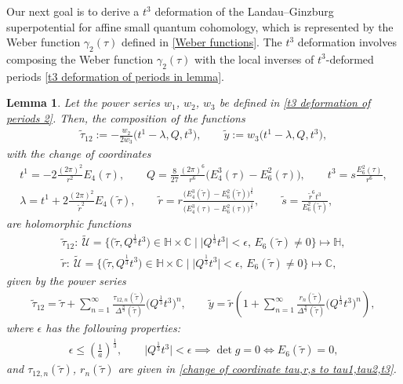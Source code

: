\documentclass[pdftex]{sigma}
\numberwithin{equation}{section}
\newtheorem{Lemma}[Theorem]{Lemma}
\begin{document}
Our next goal is to derive a $t^3$ deformation of the Landau--Ginzburg superpotential for affine small quantum cohomology, which is represented by the Weber function $\gamma_2(\tau)$ defined in \eqref{Weber functions}. The $t^3$ deformation involves composing the Weber function $\gamma_2(\tau)$ with the local inverses of $t^3$-deformed periods \eqref{t3 deformation of periods in lemma}.

\begin{Lemma}\label{lemma Milanov deformation 1 on LG superpotential}
Let the power series $w_1$, $w_2$, $w_3$ be defined in \eqref{t3 deformation of periods 2}.
Then, the composition of the functions
\begin{gather}
\tilde \tau_{12}:=-\frac{w_2}{2w_3}\bigl(t^1-\lambda,Q,t^3\bigr),\qquad
\tilde y:=w_3\bigl(t^1-\lambda,Q,t^3\bigr),\label{affine extended w2 w3 Big lemma}
\end{gather}
with the change of coordinates
\begin{gather}
t^1= -2\frac{(2\pi)^2}{r^2}E_4(\tau),\qquad Q= \frac{8}{27}\frac{(2\pi)^6}{r^6}\bigl(E_4^3(\tau)-E_6^2(\tau)\bigr),\qquad t^3= s\frac{E_6^2(\tau)}{r^6},\nonumber\\
\lambda= t^1+2\frac{(2\pi)^2}{\tilde r^2}E_4(\tilde\tau), \qquad \tilde r=r\frac{\bigl(E_4^3(\tilde\tau)-E_6^2(\tilde\tau)\bigr)^{\frac{1}{6}}}{\bigl(E_4^3(\tau)-E_6^2(\tau)\bigr)^{\frac{1}{6}}},\qquad \tilde s=\frac{\tilde r^6t^3}{E_6^2(\tilde\tau)},\label{change of extended coordinates flat intersection and auxiliary}
\end{gather}
are holomorphic functions
\begin{gather*}
\tilde\tau_{12}\colon \ \tilde{\mathcal{U}}=\bigl\{ \bigl(\tilde\tau,Q^{\frac{1}{3}}t^3\bigr)\in\mathbb{H}\times \mathbb{C}\mid \big|Q^{\frac{1}{3}}t^3\big|<\epsilon,\, E_6(\tilde\tau)\neq 0 \bigr\}\mapsto \mathbb{H},\\
\tilde r\colon \ \tilde{\mathcal{U}}=\bigl\{ \bigl(\tilde\tau,Q^{\frac{1}{3}}t^3\bigr)\in\mathbb{H}\times \mathbb{C}\mid \big|Q^{\frac{1}{3}}t^3\big|<\epsilon, \, E_6(\tilde\tau)\neq 0 \bigr\}\mapsto \mathbb{C},
\end{gather*}
given by the power series
\begin{gather}
\tilde\tau_{12}=\tilde\tau+\sum_{n=1}^{\infty}\frac{\tau_{12,n}(\tilde\tau)}{\Delta^{\frac{n}{3}}(\tilde\tau)} \bigl( Q^{\frac{1}{3}}t^3\bigr)^n,\qquad
\tilde y=\tilde r\left( 1+\sum_{n=1}^{\infty} \frac{r_n(\tilde\tau)}{\Delta^{\frac{n}{3}}(\tilde\tau)} \bigl(Q^{\frac{1}{3}} t^3 \bigr)^n \right),\label{affine in lambda t3 deformation of periods new coordinates z2 over z3 lemma}
\end{gather}
where $\epsilon$ has the following properties:
\begin{gather*}
\epsilon\leq \left(\frac{1}{a}\right)^{\frac{1}{3}} ,\qquad
\big|Q^{\frac{1}{3}}t^3\big|<\epsilon \implies \det g=0 \iff E_6(\tilde\tau)=0,
\end{gather*}
 and $\tau_{12,n}(\tilde\tau)$, $r_n(\tilde\tau)$ are given in \eqref{change of coordinate tau,r,s to tau1,tau2,t3}.


\end{Lemma}
\end{document}
